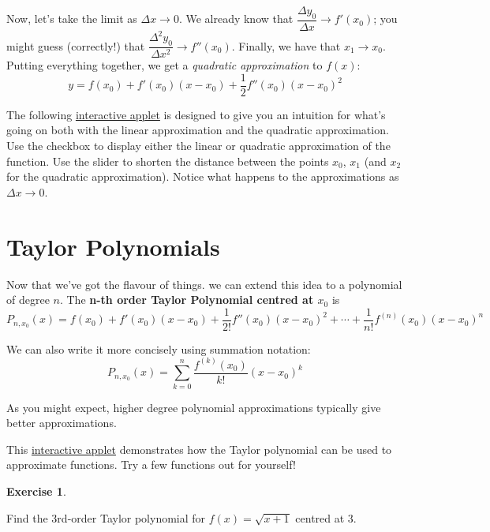 \documentclass[
]{book}
\theoremstyle{definition}
\theoremstyle{definition}
\theoremstyle{definition}
\newtheorem{exercise}{Exercise}[chapter]
\theoremstyle{definition}
\theoremstyle{remark}
\begin{document}
Now, let's take the limit as \(\Delta x \to 0\). We already know that \(\dfrac{\Delta y_0}{\Delta x}\to f'(x_0)\); you might guess (correctly!) that \(\dfrac{\Delta^2 y_0}{\Delta x^2}\to f''(x_0)\). Finally, we have that \(x_1\to x_0\). Putting everything together, we get a \emph{quadratic approximation} to \(f(x)\): \[y= f(x_0)+f'(x_0)(x-x_0)+\frac{1}{2}f''(x_0)(x-x_0)^2\]

The following \href{https://www.geogebra.org/m/csdwdaxd}{interactive applet} is designed to give you an intuition for what's going on both with the linear approximation and the quadratic approximation. Use the checkbox to display either the linear or quadratic approximation of the function. Use the slider to shorten the distance between the points \(x_0\), \(x_1\) (and \(x_2\) for the quadratic approximation). Notice what happens to the approximations as \(\Delta x \to 0\).

\hypertarget{taylor-polynomials}{%
\section{Taylor Polynomials}\label{taylor-polynomials}}

Now that we've got the flavour of things. we can extend this idea to a polynomial of degree \(n\). The \textbf{n-th order Taylor Polynomial centred at \(x_0\)} is \[P_{n, x_0}(x)= f(x_0)+f'(x_0)(x-x_0)+\frac{1}{2!}f''(x_0)(x-x_0)^2+\cdots+\frac{1}{n!}f^{(n)}(x_0)(x-x_0)^n\]

We can also write it more concisely using summation notation: \[P_{n, x_0}(x)= \sum_{k=0}^n \frac{f^{(k)}(x_0)}{k!}(x-x_0)^k\]

As you might expect, higher degree polynomial approximations typically give better approximations.

This \href{https://www.geogebra.org/m/m7knseej}{interactive applet} demonstrates how the Taylor polynomial can be used to approximate functions. Try a few functions out for yourself!

\begin{exercise}
\protect\hypertarget{exr:unlabeled-div-148}{}\label{exr:unlabeled-div-148}

Find the 3rd-order Taylor polynomial for \(f(x)=\sqrt{x+1}\) centred at \(3\).

\end{exercise}
\end{document}
